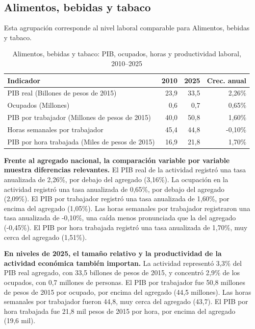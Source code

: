 \subsection{Alimentos, bebidas y tabaco}

Esta agrupación corresponde al nivel laboral comparable para Alimentos, bebidas y tabaco.

\begin{table}[H]
\centering
\caption{Alimentos, bebidas y tabaco: PIB, ocupados, horas y productividad laboral, 2010--2025}
\label{tab:agg25_c01_productividad}
\small
\begin{tabular}{lrrr}
\toprule
Indicador & 2010 & 2025 & Crec. anual \\
\midrule
PIB real  (Billones de pesos de 2015) & 23,9 & 33,5 & 2,26\% \\
Ocupados (Millones) & 0,6 & 0,7 & 0,65\% \\
PIB por trabajador (Millones de pesos de 2015) & 40,0 & 50,8 & 1,60\% \\
Horas semanales por trabajador & 45,4 & 44,8 & -0,10\% \\
PIB por hora trabajada (Miles de pesos de 2015) & 16,9 & 21,8 & 1,70\% \\
\bottomrule
\end{tabular}
\end{table}

\textbf{Frente al agregado nacional, la comparación variable por variable muestra diferencias relevantes.} El PIB real de la actividad registró una tasa anualizada de 2,26\%, por debajo del agregado (3,16\%). La ocupación en la actividad registró una tasa anualizada de 0,65\%, por debajo del agregado (2,09\%). El PIB por trabajador registró una tasa anualizada de 1,60\%, por encima del agregado (1,05\%). Las horas semanales por trabajador registraron una tasa anualizada de -0,10\%, una caída menos pronunciada que la del agregado (-0,45\%). El PIB por hora trabajada registró una tasa anualizada de 1,70\%, muy cerca del agregado (1,51\%).

\textbf{En niveles de 2025, el tamaño relativo y la productividad de la actividad económica también importan.} La actividad representó 3,3\% del PIB real agregado, con 33,5 billones de pesos de 2015, y concentró 2,9\% de los ocupados, con 0,7 millones de personas. El PIB por trabajador fue 50,8 millones de pesos de 2015 por ocupado, por encima del agregado (44,5 millones). Las horas semanales por trabajador fueron 44,8, muy cerca del agregado (43,7). El PIB por hora trabajada fue 21,8 mil pesos de 2015 por hora, por encima del agregado (19,6 mil).

